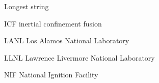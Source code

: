 \begin{glossary}{Longest  string}
%
  \item[ICF]
     inertial confinement fusion
%
  \item[LANL]
     Los Alamos National Laboratory
  \item[LLNL]
     Lawrence Livermore National Laboratory
%
  \item[NIF]
     National Ignition Facility
     
\end{glossary}

\endinput %